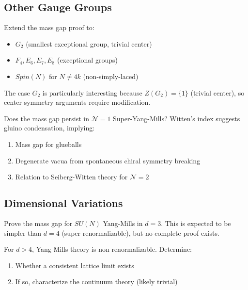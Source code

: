 \subsection{Other Gauge Groups}

\begin{problem}
Extend the mass gap proof to:
\begin{itemize}
\item $G_2$ (smallest exceptional group, trivial center)
\item $F_4, E_6, E_7, E_8$ (exceptional groups)
\item $Spin(N)$ for $N \neq 4k$ (non-simply-laced)
\end{itemize}
\end{problem}

The case $G_2$ is particularly interesting because $Z(G_2) = \{1\}$ (trivial 
center), so center symmetry arguments require modification.

\begin{problem}
Does the mass gap persist in $\mathcal{N} = 1$ Super-Yang-Mills? 
Witten's index suggests gluino condensation, implying:
\begin{enumerate}[label=(\roman*)]
\item Mass gap for glueballs
\item Degenerate vacua from spontaneous chiral symmetry breaking
\item Relation to Seiberg-Witten theory for $\mathcal{N} = 2$
\end{enumerate}
\end{problem}

\subsection{Dimensional Variations}

\begin{problem}
Prove the mass gap for $SU(N)$ Yang-Mills in $d = 3$. This is expected to 
be simpler than $d = 4$ (super-renormalizable), but no complete proof exists.
\end{problem}

\begin{problem}
For $d > 4$, Yang-Mills theory is non-renormalizable. Determine:
\begin{enumerate}[label=(\alph*)]
\item Whether a consistent lattice limit exists
\item If so, characterize the continuum theory (likely trivial)
\end{enumerate}
\end{problem}

